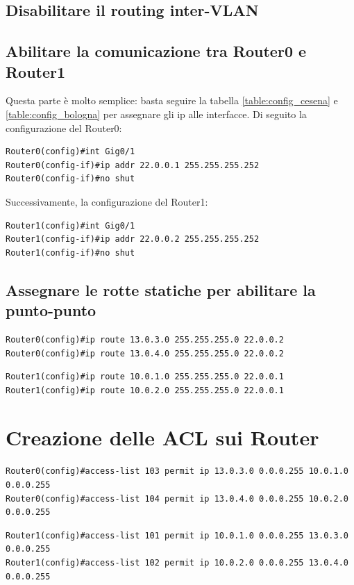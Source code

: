 \documentclass[a4paper,12pt]{report}
\begin{document}
\subsection{Disabilitare il routing inter-VLAN}
\subsection{Abilitare la comunicazione tra Router0 e Router1}
Questa parte è molto semplice: basta seguire la tabella \ref{table:config_cesena} e \ref{table:config_bologna} per assegnare gli ip alle interfacce.
Di seguito la configurazione del Router0:
\begin{verbatim}
Router0(config)#int Gig0/1
Router0(config-if)#ip addr 22.0.0.1 255.255.255.252
Router0(config-if)#no shut
\end{verbatim}
Successivamente, la configurazione del Router1:
\begin{verbatim}
Router1(config)#int Gig0/1
Router1(config-if)#ip addr 22.0.0.2 255.255.255.252
Router1(config-if)#no shut
\end{verbatim}
\subsection{Assegnare le rotte statiche per abilitare la punto-punto}
\begin{verbatim}
Router0(config)#ip route 13.0.3.0 255.255.255.0 22.0.0.2
Router0(config)#ip route 13.0.4.0 255.255.255.0 22.0.0.2
\end{verbatim}
\begin{verbatim}
Router1(config)#ip route 10.0.1.0 255.255.255.0 22.0.0.1
Router1(config)#ip route 10.0.2.0 255.255.255.0 22.0.0.1
\end{verbatim}
\section{Creazione delle ACL sui Router}
\begin{verbatim}
Router0(config)#access-list 103 permit ip 13.0.3.0 0.0.0.255 10.0.1.0 0.0.0.255
Router0(config)#access-list 104 permit ip 13.0.4.0 0.0.0.255 10.0.2.0 0.0.0.255
\end{verbatim}
\begin{verbatim}
Router1(config)#access-list 101 permit ip 10.0.1.0 0.0.0.255 13.0.3.0 0.0.0.255
Router1(config)#access-list 102 permit ip 10.0.2.0 0.0.0.255 13.0.4.0 0.0.0.255
\end{verbatim}
\end{document}
